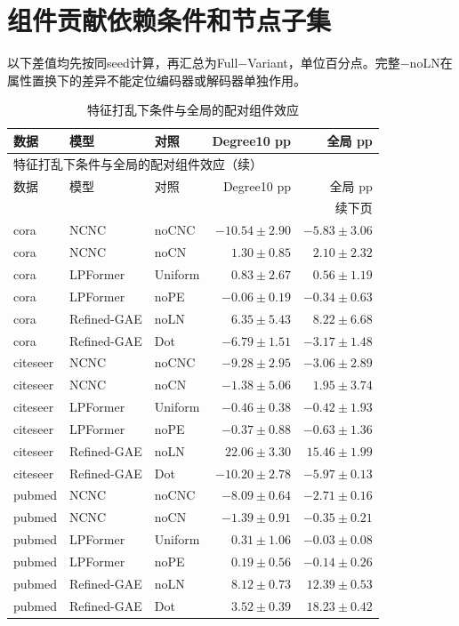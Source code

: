 \documentclass[UTF8,a4paper,11pt,fontset=fandol]{ctexart}
\begin{document}
\section{组件贡献依赖条件和节点子集}
以下差值均先按同seed计算，再汇总为Full−Variant，单位百分点。完整−noLN在属性置换下的差异不能定位编码器或解码器单独作用。
{\footnotesize
\setlength{\tabcolsep}{3pt}
\begin{longtable}{lllrr}
\caption{特征打乱下条件与全局的配对组件效应}\\
\toprule
数据 & 模型 & 对照 & Degree10 pp & 全局 pp \\
\midrule
\endfirsthead
\multicolumn{5}{l}{特征打乱下条件与全局的配对组件效应（续）}\\
\toprule
数据 & 模型 & 对照 & Degree10 pp & 全局 pp \\
\midrule
\endhead
\midrule\multicolumn{5}{r}{续下页}\\
\endfoot
\bottomrule\endlastfoot
cora & NCNC & noCNC & $-10.54\pm2.90$ & $-5.83\pm3.06$ \\
cora & NCNC & noCN & $1.30\pm0.85$ & $2.10\pm2.32$ \\
cora & LPFormer & Uniform & $0.83\pm2.67$ & $0.56\pm1.19$ \\
cora & LPFormer & noPE & $-0.06\pm0.19$ & $-0.34\pm0.63$ \\
cora & Refined-GAE & noLN & $6.35\pm5.43$ & $8.22\pm6.68$ \\
cora & Refined-GAE & Dot & $-6.79\pm1.51$ & $-3.17\pm1.48$ \\
citeseer & NCNC & noCNC & $-9.28\pm2.95$ & $-3.06\pm2.89$ \\
citeseer & NCNC & noCN & $-1.38\pm5.06$ & $1.95\pm3.74$ \\
citeseer & LPFormer & Uniform & $-0.46\pm0.38$ & $-0.42\pm1.93$ \\
citeseer & LPFormer & noPE & $-0.37\pm0.88$ & $-0.63\pm1.36$ \\
citeseer & Refined-GAE & noLN & $22.06\pm3.30$ & $15.46\pm1.99$ \\
citeseer & Refined-GAE & Dot & $-10.20\pm2.78$ & $-5.97\pm0.13$ \\
pubmed & NCNC & noCNC & $-8.09\pm0.64$ & $-2.71\pm0.16$ \\
pubmed & NCNC & noCN & $-1.39\pm0.91$ & $-0.35\pm0.21$ \\
pubmed & LPFormer & Uniform & $0.31\pm1.06$ & $-0.03\pm0.08$ \\
pubmed & LPFormer & noPE & $0.19\pm0.56$ & $-0.14\pm0.26$ \\
pubmed & Refined-GAE & noLN & $8.12\pm0.73$ & $12.39\pm0.53$ \\
pubmed & Refined-GAE & Dot & $3.52\pm0.39$ & $18.23\pm0.42$ \\
\end{longtable}
}
\end{document}

